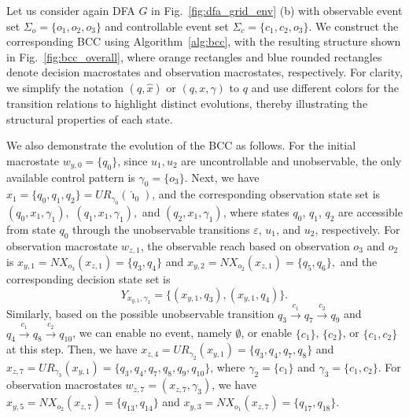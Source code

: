 \documentclass[final,5p,times,twocolumn,authoryear]{elsarticle}
\begin{document}
\begin{example}\label{ex:bcc}
    Let us consider again DFA $G$ in Fig.~\ref{fig:dfa_grid_env} (b) with observable event set $\Sigma_o = \{o_1, o_2, o_3\}$ and controllable event set $\Sigma_c = \{ c_1, c_2, o_3 \}$. 
    We construct the corresponding BCC using Algorithm~\ref{alg:bcc}, with the resulting structure shown in Fig.~\ref{fig:bcc_overall}, where orange rectangles and blue rounded rectangles denote decision macrostates and observation macrostates, respectively. 
    For clarity, we simplify the notation $(q, \hat{x})$ or $(q, x, \gamma)$ to $q$ and use different colors for the transition relations to highlight distinct evolutions, thereby illustrating the structural properties of each state.

    We also demonstrate the evolution of the BCC as follows.
    For the initial macrostate $w_{y,0} = \{ q_0 \}$, since $u_1, u_2$ are uncontrollable and unobservable, the only available control pattern is $\gamma_0 = \{ o_3 \}$.
    Next, we have $x_{1} = \{ q_0, q_1, q_2 \} = UR_{\gamma_0}(\hat{\imath}_0)$, and the corresponding observation state set is  
    $
    (q_0, x_{1}, \gamma_1),
    $
    $
    (q_1, x_{1}, \gamma_1),
    $
    and
    $(q_2, x_{1}, \gamma_1)$,
    where states $q_0$, $q_1$, $q_2$ are accessible from state $q_0$ through the unobservable transitions $\varepsilon$, $u_1$, and $u_2$, respectively.
    For observation macrostate $w_{z,1}$, the observable reach based on observation $o_3$ and $o_2$ is
    $x_{y,1} = NX_{o_3}(x_{z,1}) = \{ q_3, q_4 \}$ and $x_{y,2} = NX_{o_2}(x_{z,1}) = \{ q_5, q_6 \},$ 
    and the corresponding decision state set is 
    $$
    Y_{x_{y,1}, \gamma_1} = \{(x_{y,1}, q_3), (x_{y,1}, q_4) \}.
    $$
    Similarly, based on the possible unobservable transition $q_3 \xrightarrow{c_1} q_7 \xrightarrow{c_2} q_9$ and $q_4 \xrightarrow{c_1} q_8 \xrightarrow{c_2} q_{10}$, we can enable no event, namely $\emptyset$, or enable $\{ c_1 \}$, $\{ c_2 \}$, or $\{ c_1,c_2 \}$ at this step.
    Then, we have
    $x_{z,4} = UR_{\gamma_2}(x_{y,1}) = \{ q_3, q_4, q_7, q_8 \}$ and
    $x_{z,7} = UR_{\gamma_3}(x_{y,1}) = \{ q_3, q_4, q_7, q_8, q_9, q_{10} \}$,
    where $\gamma_2 = \{ c_1 \}$ and $\gamma_3 = \{ c_1, c_2 \}$.
    For observation macrostates $w_{z,7} = (x_{z,7}, \gamma_3)$, we have
    $x_{y,5} = NX_{o_2}(x_{z,7}) = \{ q_{13}, q_{14} \}$ and
    $x_{y,3} = NX_{o_1}(x_{z,7}) = \{ q_{17}, q_{18} \}$.
\end{example}
\end{document}

